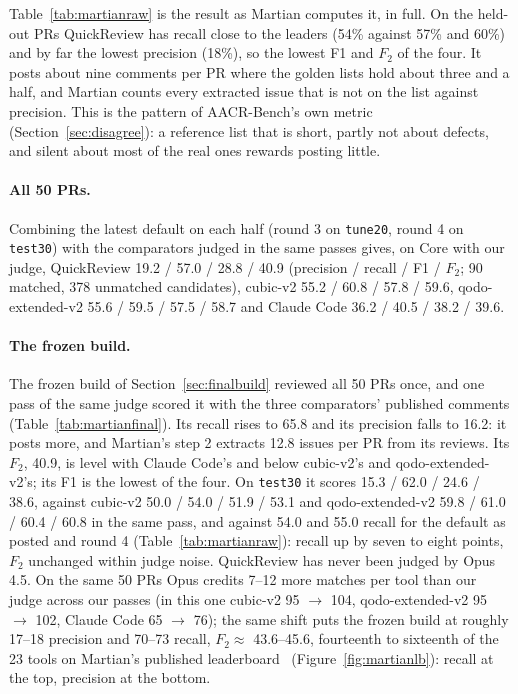 \documentclass[11pt,a4paper]{article}
\newcommand{\qcr}{QuickReview}
\newcommand{\code}[1]{\texttt{#1}}
\begin{document}
Table~\ref{tab:martianraw} is the result as Martian computes it, in full.
On the held-out PRs \qcr{} has recall close to the leaders (54\% against 57\%
and 60\%) and by far the lowest precision (18\%), so the lowest F1 and $F_2$
of the four. It posts about nine comments per PR where the golden lists hold
about three and a half, and Martian counts every extracted issue that is not
on the list against precision. This is the pattern of AACR-Bench's own metric
(Section~\ref{sec:disagree}): a reference list that is short, partly not
about defects, and silent about most of the real ones rewards posting little.

\paragraph{All 50 PRs.} Combining the latest default on each half (round 3 on
\code{tune20}, round 4 on \code{test30}) with the comparators judged in the
same passes gives, on Core with our judge, \qcr{} 19.2 / 57.0 / 28.8 / 40.9
(precision / recall / F1 / $F_2$; 90 matched, 378 unmatched candidates),
cubic-v2 55.2 / 60.8 / 57.8 / 59.6, qodo-extended-v2 55.6 / 59.5 / 57.5 /
58.7 and Claude Code 36.2 / 40.5 / 38.2 / 39.6.

\paragraph{The frozen build.} The frozen build of
Section~\ref{sec:finalbuild} reviewed all 50 PRs once, and one pass of the
same judge scored it with the three comparators' published comments
(Table~\ref{tab:martianfinal}). Its recall rises to 65.8 and its precision
falls to 16.2: it posts more, and Martian's step 2 extracts 12.8 issues per
PR from its reviews. Its $F_2$, 40.9, is level with Claude Code's and below
cubic-v2's and qodo-extended-v2's; its F1 is the lowest of the four. On
\code{test30} it scores 15.3 / 62.0 / 24.6 / 38.6, against
cubic-v2 50.0 / 54.0 / 51.9 / 53.1 and qodo-extended-v2 59.8 / 61.0 / 60.4 /
60.8 in the same pass, and against 54.0 and 55.0 recall for the default as
posted and round 4 (Table~\ref{tab:martianraw}): recall up by seven to eight
points, $F_2$ unchanged within judge noise. \qcr{} has never been judged by Opus 4.5. On the same
50 PRs Opus credits 7--12 more matches per tool than our judge across our
passes (in this one cubic-v2 95 $\to$ 104, qodo-extended-v2 95 $\to$ 102,
Claude Code 65 $\to$ 76); the same shift puts the frozen build at roughly
17--18 precision and 70--73 recall, $F_2 \approx$ 43.6--45.6, fourteenth to
sixteenth of the 23 tools on Martian's published leaderboard~\cite{martiansite}
(Figure~\ref{fig:martianlb}):
recall at the top, precision at the bottom.
\end{document}
